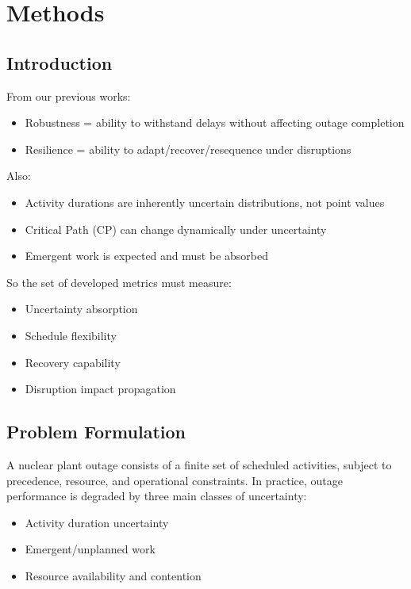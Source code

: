 \section{Methods}

\subsection{Introduction}
From our previous works:
\begin{itemize}
\item Robustness = ability to withstand delays without affecting outage completion
\item Resilience = ability to adapt/recover/resequence under disruptions
\end{itemize}

Also:
\begin{itemize}
\item Activity durations are inherently uncertain distributions, not point values
\item Critical Path (CP) can change dynamically under uncertainty
\item Emergent work is expected and must be absorbed
\end{itemize}

So the set of developed metrics must measure:
\begin{itemize}
\item Uncertainty absorption
\item Schedule flexibility
\item Recovery capability
\item Disruption impact propagation
\end{itemize}

\subsection{Problem Formulation}

A nuclear plant outage consists of a finite set of scheduled activities, subject to precedence, resource, and operational constraints. In practice, outage performance is degraded by three main classes of uncertainty:
\begin{itemize}
\item Activity duration uncertainty
\item Emergent/unplanned work
\item Resource availability and contention
\end{itemize}

